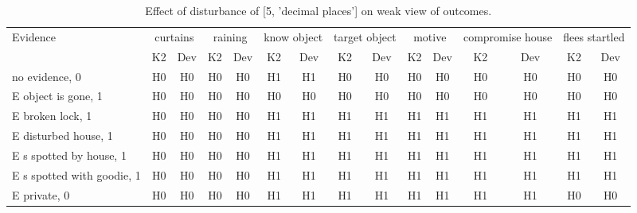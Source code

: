\begin{table}\begin{tabular}{l|cc|cc|cc|cc|cc|cc|cc}\toprule\multirow{2}{*}{Evidence} & \multicolumn{2}{c}{curtains}& \multicolumn{2}{c}{raining}& \multicolumn{2}{c}{know object}& \multicolumn{2}{c}{target object}& \multicolumn{2}{c}{motive}& \multicolumn{2}{c}{compromise house}& \multicolumn{2}{c}{flees startled}\\& {K2} & {Dev}& {K2} & {Dev}& {K2} & {Dev}& {K2} & {Dev}& {K2} & {Dev}& {K2} & {Dev}& {K2} & {Dev}\\\midrule
no evidence, 0 & H0&H0&H0&H0&H1&H1&H0&H0&H0&H0&H0&H0&H0&H0\\E object is gone, 1 & H0&H0&H0&H0&H0&H0&H0&H0&H0&H0&H0&H0&H0&H0\\E broken lock, 1 & H0&H0&H0&H0&H1&H1&H1&H1&H1&H1&H1&H1&H1&H1\\E disturbed house, 1 & H0&H0&H0&H0&H1&H1&H1&H1&H1&H1&H1&H1&H1&H1\\E s spotted by house, 1 & H0&H0&H0&H0&H1&H1&H1&H1&H1&H1&H1&H1&H1&H1\\E s spotted with goodie, 1 & H0&H0&H0&H0&H1&H1&H1&H1&H1&H1&H1&H1&H1&H1\\E private, 0 & H0&H0&H0&H0&H1&H1&H1&H1&H1&H1&H1&H1&H0&H0\\\bottomrule\end{tabular}\caption{Effect of disturbance of [5, 'decimal places'] on weak view of outcomes.}\end{table}